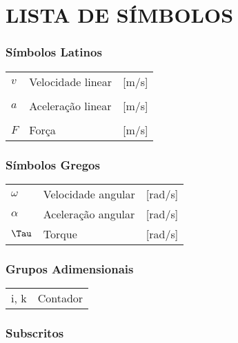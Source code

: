 




\chapter*{LISTA DE SÍMBOLOS}


\subsection*{Símbolos Latinos}

\begin{tabular}{p{}p{}>{\PreserveBacklash\raggedleft}p{}}
$v$  & Velocidade linear  & {[}m/s{]}\tabularnewline\\
$a$  & Aceleração linear  & {[}m/s{]}\tabularnewline\\
$F$  & Força  & {[}m/s{]}\tabularnewline
\end{tabular}


\subsection*{Símbolos Gregos}

\begin{tabular}{p{}p{}>{\PreserveBacklash\raggedleft}p{}}
$\omega$ & Velocidade angular & {[}rad/s{]}\tabularnewline
$\alpha$ & Aceleração angular & {[}rad/s{]}\tabularnewline
$\Tau$ & Torque & {[}rad/s{]}\tabularnewline
\end{tabular}


\subsection*{Grupos Adimensionais}

\begin{tabular}{p{}p{}}
i, k & Contador\tabularnewline
\end{tabular}


\subsection*{Subscritos}

